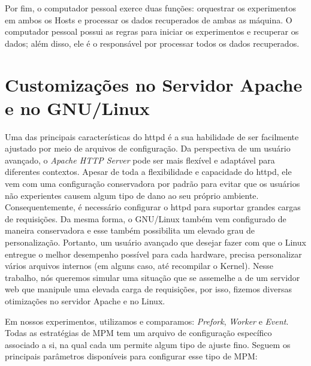 Por fim, o computador pessoal exerce duas funções: orquestrar os experimentos
em ambos os Hosts e processar os dados recuperados de ambas as máquina. O
computador pessoal possui as regras para iniciar os experimentos e recuperar os
dados; além disso, ele é o responsável por processar todos os dados
recuperados.

\section{Customizações no Servidor Apache e no GNU/Linux}
\label{sec:customization}

Uma das principais características do httpd é a sua habilidade de ser
facilmente ajustado por meio de arquivos de configuração. Da perspectiva de um
usuário avançado, o \emph{Apache HTTP Server} pode ser mais flexível e adaptável para
diferentes contextos. Apesar de toda a flexibilidade e capacidade do httpd,
ele vem com uma configuração conservadora por padrão para evitar que os
usuários não experientes causem algum tipo de dano ao seu próprio ambiente.
Consequentemente, é necessário configurar o httpd para suportar grandes cargas
de requisições. Da mesma forma, o GNU/Linux também vem configurado de maneira
conservadora e esse também possibilita um elevado grau de personalização.
Portanto, um usuário avançado que desejar fazer com que o Linux entregue o
melhor desempenho possível para cada hardware, precisa personalizar vários
arquivos internos (em alguns caso, até recompilar o Kernel). Nesse trabalho,
nós queremos simular uma situação que se assemelhe a de um servidor web que
manipule uma elevada carga de requisições, por isso, fizemos diversas
otimizações no servidor Apache e no Linux.

Em nossos experimentos, utilizamos e comparamos: \emph{Prefork},
\emph{Worker} e \emph{Event}. Todas as estratégias de MPM tem um arquivo de
configuração específico associado a si, na qual cada um permite algum tipo de
ajuste fino. Seguem os principais parâmetros disponíveis para configurar esse
tipo de MPM:

